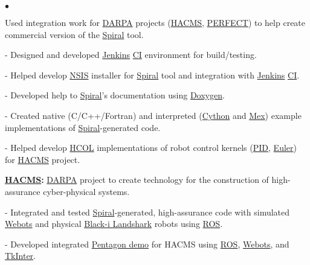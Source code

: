 \documentclass{article}
\newcommand{\lineunder}{\vspace*{-8pt} \\ \hspace*{-18pt} \hrulefill \\}
\newcommand{\header}[1]{{\hspace*{-15pt}\vspace*{6pt} \textsc{#1}} \vspace*{-6pt} \lineunder}
\newenvironment{achievements}{\begin{list}{$\bullet$}{\topsep 0pt \itemsep -2pt}}{\vspace*{4pt}\end{list}}
\begin{document}
\begin{achievements}

\item Used integration work for \href{http://www.darpa.mil/default.aspx}{DARPA} projects (\href{http://www.darpa.mil/Our_Work/I2O/Programs/High-Assurance_Cyber_Military_Systems_(HACMS).aspx}{HACMS}, \href{http://www.darpa.mil/Our_Work/MTO/Programs/Power_Efficiency_Revolution_for_Embedded_Computing_Technologies_(PERFECT).aspx}{PERFECT}) to help create commercial version of the \href{http://spiral.net/}{Spiral} tool. 

- Designed and developed \href{http://jenkins-ci.org/}{Jenkins} 
\href{http://en.wikipedia.org/wiki/Continuous_integration}{CI}  
environment for build/testing.

- Helped develop \href{http://nsis.sourceforge.net/Main_Page}{NSIS} installer for \href{http://spiral.net/}{Spiral} tool and integration with \href{http://jenkins-ci.org/}{Jenkins} 
\href{http://en.wikipedia.org/wiki/Continuous_integration}{CI}.

- Developed help to \href{http://spiral.net/}{Spiral}'s documentation using \href{http://www.doxygen.org/}{Doxygen}.

- Created  native (C/C++/Fortran) and interpreted (\href{http://cython.org/}{Cython} and \href{http://www.mathworks.com/help/matlab/ref/mex.html}{Mex}) example implementations of \href{http://spiral.net/}{Spiral}-generated code. 

- Helped develop \href{https://wiki.hh.se/wg211/images/e/e0/M13Franchetti.pdf}{HCOL} implementations of robot control 
kernels (\href{http://en.wikipedia.org/wiki/PID_controller}{PID}, 
\href{http://en.wikipedia.org/wiki/Euler_method}{Euler}) for \href{http://www.darpa.mil/Our_Work/I2O/Programs/High-Assurance_Cyber_Military_Systems_(HACMS).aspx}{HACMS} project.  

\item \textbf{\href{http://www.darpa.mil/Our_Work/I2O/Programs/High-Assurance_Cyber_Military_Systems_(HACMS).aspx}{HACMS}:}
\href{http://www.darpa.mil/default.aspx}{DARPA} project to create technology for the construction of high-assurance cyber-physical systems. 

- Integrated and tested \href{http://spiral.net/}{Spiral}-generated, high-assurance code with simulated \href{http://www.cyberbotics.com/}{Webots} and physical \href{http://www.blackirobotics.com/}{Black-i Landshark} robots using \href{http://www.ros.org/}{ROS}. 

- Developed integrated \href{http://www.darpa.mil/NewsEvents/Releases/2014/05/21.aspx}{Pentagon demo} for HACMS using \href{http://www.ros.org/}{ROS}, \href{http://www.cyberbotics.com/}{Webots}, and \href{https://wiki.python.org/moin/TkInter}{TkInter}. 


\end{achievements}
\end{document}
